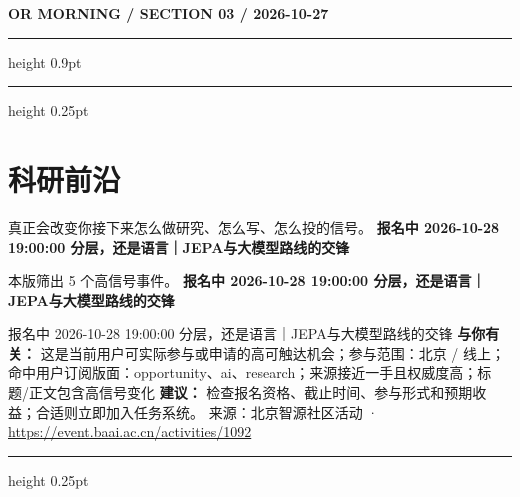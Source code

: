 \documentclass[10.5pt]{ctexart}
\begin{document}
\newpage
{\small\bfseries OR MORNING / SECTION 03 / 2026-10-27}
\vspace{2mm}
\hrule height 0.9pt
\vspace{1.5mm}
\hrule height 0.25pt
\vspace{4mm}
\section*{科研前沿}
{\color{ormuted} 真正会改变你接下来怎么做研究、怎么写、怎么投的信号。}
\vspace{2mm}
{\LARGE\bfseries 报名中 2026-10-28 19:00:00 分层，还是语言｜JEPA与大模型路线的交锋}\par
\vspace{1mm}
{\color{ormuted} 本版筛出 5 个高信号事件。}
\vspace{3mm}
{\Large\bfseries 报名中 2026-10-28 19:00:00 分层，还是语言｜JEPA与大模型路线的交锋}\par
报名中 2026-10-28 19:00:00 分层，还是语言｜JEPA与大模型路线的交锋
\textbf{与你有关：} 这是当前用户可实际参与或申请的高可触达机会；参与范围：北京 / 线上；命中用户订阅版面：opportunity、ai、research；来源接近一手且权威度高；标题/正文包含高信号变化
\textbf{建议：} 检查报名资格、截止时间、参与形式和预期收益；合适则立即加入任务系统。
{\footnotesize\color{ormuted} 来源：北京智源社区活动 · \url{https://event.baai.ac.cn/activities/1092}}
\vspace{4mm}
\hrule height 0.25pt
\vspace{3mm}
\end{document}

